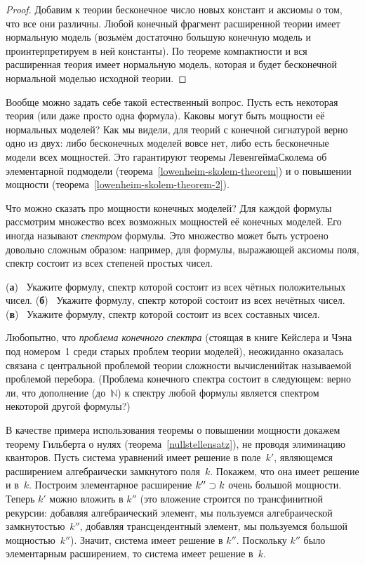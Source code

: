 \begin{proof}
Добавим к теории бесконечное число новых констант и аксиомы о
том, что все они различны. Любой конечный фрагмент расширенной
теории имеет нормальную модель (возьмём достаточно большую
конечную модель и проинтерпретируем в ней константы). По теореме
компактности и вся расширенная теория имеет нормальную модель,
которая и будет бесконечной нормальной моделью исходной теории.
\end{proof}

Вообще можно задать себе такой естественный вопрос. Пусть есть
некоторая теория (или даже просто одна формула). Каковы могут
быть мощности её нормальных моделей? Как мы видели, для теорий с
конечной сигнатурой верно одно из двух: либо бесконечных моделей
вовсе нет, либо есть бесконечные модели всех мощностей. Это
гарантируют теоремы Левенгейма\ч Сколема об элементарной
подмодели (теорема~\ref{lowenheim-skolem-theorem}) и о повышении
мощности (теорема~\ref{lowenheim-skolem-theorem-2}).

Что можно сказать про мощности конечных моделей? Для каждой
формулы рассмотрим множество всех возможных мощностей её
конечных моделей. Его иногда называют \emph{спектром}%
%
формулы.
Это множество может быть устроено довольно сложным образом:
например, для формулы, выражающей аксиомы поля, спектр состоит
из всех степеней простых чисел.

\begin{problem}
        (\textbf{а})~%
Укажите формулу, спектр которой состоит из всех чётных положительных
чисел.
        (\textbf{б})~%
Укажите формулу, спектр которой состоит из всех нечётных чисел.
        (\textbf{в})~%
Укажите формулу, спектр которой состоит из всех составных чисел.
\end{problem}

Любопытно, что \emph{проблема конечного спектра}%
(стоящая в
книге Кейслера и Чэна~\cite{keisler-chang} под номером~1 среди  старых проблем
теории моделей), неожиданно оказалась связана с центральной
проблемой теории сложности вычислений\т так называемой 
проблемой перебора. (Проблема конечного спектра состоит в
следующем: верно ли, что дополнение (до~$\mathbb{N}$) к спектру
любой формулы является спектром некоторой другой формулы?)

В качестве примера использования теоремы о повышении мощности
докажем теорему Гильберта о нулях
(теорема~\ref{nullstellensatz}), не проводя элиминацию
кванторов. Пусть система уравнений имеет решение в поле~$k'$,
являющемся расширением алгебраически замкнутого поля~$k$.
Покажем, что она имеет решение и в~$k$. Построим элементарное
расширение $k''\hm\supset k$ очень большой мощности. Теперь $k'$
можно вложить в $k''$ (это вложение строится по трансфинитной
рекурсии: добавляя алгебраический элемент, мы пользуемся
алгебраической замкнутостью~$k''$, добавляя трансцендентный
элемент, мы пользуемся большой мощностью~$k''$). Значит, система
имеет решение в $k''$. Поскольку $k''$ было элементарным
расширением, то система имеет решение в~$k$.

